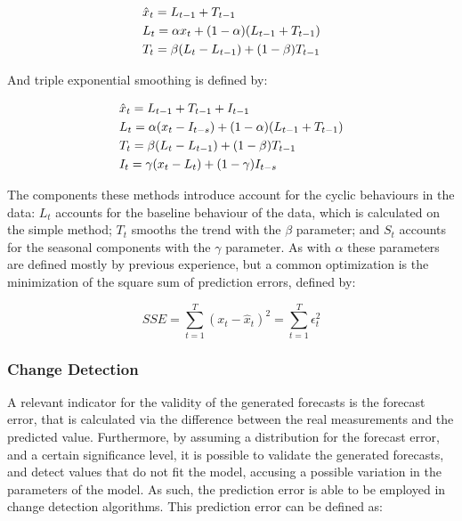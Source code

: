 \begin {equation*}
\centering
\begin {split}
&\hat{x}_t = L_{t-1} + T_{t-1} \\
&L_t = \alpha x_t + (1-\alpha)(L_{t-1} + T_{t-1}) \\
&T_t = \beta (L_t - L_{t-1}) + (1-\beta)T_{t-1}
\end {split}
\label{eq:exp_smooth}
\end {equation*}

\par And triple exponential smoothing is defined by:

\begin {equation*}
\centering
\begin {split}
&\hat{x}_t = L_{t-1} + T_{t-1} + I_{t-1}\\
&L_t = \alpha (x_t - I_{t-s}) + (1-\alpha)(L_{t-1} + T_{t-1}) \\
&T_t = \beta (L_t - L_{t-1}) + (1-\beta)T_{t-1} \\
&I_t = \gamma (x_t - L_t) + (1-\gamma)I_{t-s}
\end {split}
\label{eq:exp_smooth}
\end {equation*}

\par The components these methods introduce account for the cyclic behaviours in the data: $L_t$ accounts for the baseline behaviour of the data, which is 
calculated on the simple method; $T_t$ smooths the trend with the $\beta$ parameter; and $S_t$ accounts for the seasonal components with the $\gamma$ parameter.
As with $\alpha$ these parameters are defined mostly by previous experience, but a common optimization is the minimization of the square sum of prediction errors, defined by:

\begin {equation*} 
    \label{eq:sse}
    SSE = \sum_{t=1}^T{(x_t-\hat{x}_{t})^2} = \sum_{t=1}^T{\epsilon_t^2}
\end {equation*}

\subsubsection {Change Detection} \label{subsec:change_detection}

A relevant indicator for the validity of the generated forecasts is the forecast error, that is calculated via the difference between the real measurements and the
predicted value. Furthermore, by assuming a distribution for the forecast error, and a certain significance level, it is possible to validate the generated forecasts,
and detect values that do not fit the model, accusing a possible variation in the parameters of the model. As such, the prediction error is able to be employed in 
change detection algorithms. This prediction error can be defined as:

